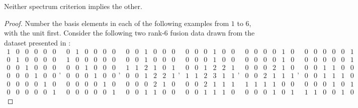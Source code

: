 \documentclass{amsart}
\begin{document}
\begin{proposition}\label{prop:spectrum-incomparable}
Neither spectrum criterion implies the other.
\end{proposition}
\begin{proof}
Number the basis elements in each of the following examples from $1$ to $6$, with the unit first. Consider the following two rank-$6$ fusion data drawn from the dataset presented in \cite{SliVer}: %
$$ {\begin{smallmatrix}1 & 0 & 0 & 0 & 0 & 0 \\0 & 1 & 0 & 0 & 0 & 0 \\0 & 0 & 1 & 0 & 0 & 0 \\0 & 0 & 0 & 1 & 0 & 0 \\0 & 0 & 0 & 0 & 1 & 0 \\0 & 0 & 0 & 0 & 0 & 1\end{smallmatrix} , \ \begin{smallmatrix}0 & 1 & 0 & 0 & 0 & 0 \\1 & 0 & 0 & 0 & 0 & 0 \\0 & 0 & 1 & 0 & 0 & 0 \\0 & 0 & 0 & 1 & 0 & 0 \\0 & 0 & 0 & 0 & 1 & 0 \\0 & 0 & 0 & 0 & 0 & 1\end{smallmatrix} , \ \begin{smallmatrix}0 & 0 & 1 & 0 & 0 & 0 \\0 & 0 & 1 & 0 & 0 & 0 \\1 & 1 & 2 & 1 & 0 & 1 \\0 & 0 & 1 & 2 & 2 & 1 \\0 & 0 & 0 & 2 & 1 & 0 \\0 & 0 & 1 & 1 & 0 & 0\end{smallmatrix} , \ \begin{smallmatrix}0 & 0 & 0 & 1 & 0 & 0 \\0 & 0 & 0 & 1 & 0 & 0 \\0 & 0 & 1 & 2 & 2 & 1 \\1 & 1 & 2 & 3 & 1 & 1 \\0 & 0 & 2 & 1 & 1 & 1 \\0 & 0 & 1 & 1 & 1 & 0\end{smallmatrix} , \ \begin{smallmatrix}0 & 0 & 0 & 0 & 1 & 0 \\0 & 0 & 0 & 0 & 1 & 0 \\0 & 0 & 0 & 2 & 1 & 0 \\0 & 0 & 2 & 1 & 1 & 1 \\1 & 1 & 1 & 1 & 0 & 0 \\0 & 0 & 0 & 1 & 0 & 1\end{smallmatrix} , \ \begin{smallmatrix}0 & 0 & 0 & 0 & 0 & 1 \\0 & 0 & 0 & 0 & 0 & 1 \\0 & 0 & 1 & 1 & 0 & 0 \\0 & 0 & 1 & 1 & 1 & 0 \\0 & 0 & 0 & 1 & 0 & 1 \\1 & 1 & 0 & 0 & 1 & 0\end{smallmatrix}} $$


\end{proof}
\end{document}

